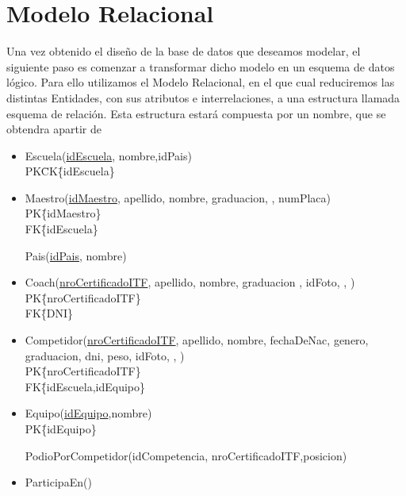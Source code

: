 \section{Modelo Relacional}

Una vez obtenido el diseño de la base de datos que deseamos modelar, el siguiente paso es comenzar a transformar dicho modelo en un esquema de datos lógico. Para ello utilizamos el Modelo Relacional, en el que cual reduciremos las distintas Entidades, con sus atributos e interrelaciones, a una estructura llamada esquema de relación. Esta estructura estará compuesta por un nombre, que se obtendra apartir de 

\begin{itemize}

\item{Escuela(\underline{idEscuela}, nombre,idPais)\\
PK\=CK\=\{idEscuela\}}

\item{Maestro(\underline{idMaestro}, apellido, nombre, graduacion, , numPlaca)\\
PK\=\{idMaestro\} \\
FK\=\{idEscuela\} \\
}

Pais(\underline{idPais}, nombre)

\item{Coach(\underline{nroCertificadoITF}, apellido, nombre, graduacion , idFoto, , )\\
PK\=\{nroCertificadoITF\} \\
FK\=\{DNI\} \\
}

\item{Competidor(\underline{nroCertificadoITF}, apellido, nombre, fechaDeNac, genero, graduacion, dni, peso, idFoto, , ) \\
PK\=\{nroCertificadoITF\} \\
FK\=\{idEscuela,idEquipo\}
}
\item{Equipo(\underline{idEquipo},nombre)\\
PK\=\{idEquipo\} \\
}

PodioPorCompetidor(idCompetencia, nroCertificadoITF,posicion)

\item ParticipaEn()


\end{itemize}
